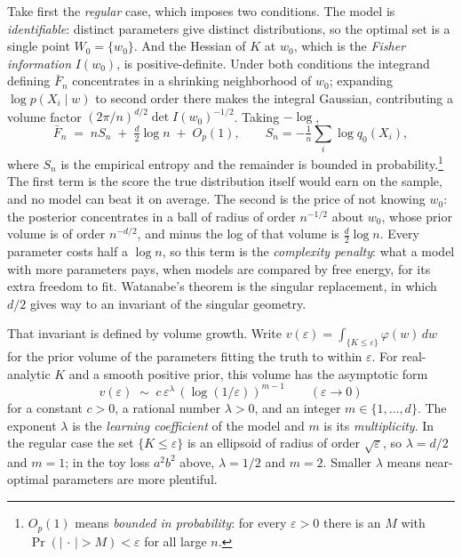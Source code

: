 Take first the \emph{regular} case, which imposes two conditions. The model is \emph{identifiable}: distinct parameters give distinct distributions, so the optimal set is a single point $W_0=\{w_0\}$. And the Hessian of $K$ at $w_0$, which is the \emph{Fisher information} $I(w_0)$, is positive-definite. Under both conditions the integrand defining $\bar F_n$ concentrates in a shrinking neighborhood of $w_0$; expanding $\log p(X_i\mid w)$ to second order there makes the integral Gaussian, contributing a volume factor $(2\pi/n)^{d/2}\det I(w_0)^{-1/2}$. Taking $-\log$,
\[
   \bar F_n \;=\; nS_n \;+\; \tfrac{d}{2}\log n \;+\; O_p(1),
   \qquad S_n=-\tfrac1n\textstyle\sum_i\log q_0(X_i),
\]
where $S_n$ is the empirical entropy and the remainder is bounded in probability.\footnote{$O_p(1)$ means \emph{bounded in probability}: for every $\varepsilon>0$ there is an $M$ with $\Pr(|\,\cdot\,|>M)<\varepsilon$ for all large $n$.} The first term is the score the true distribution itself would earn on the sample, and no model can beat it on average. The second is the price of not knowing $w_0$: the posterior concentrates in a ball of radius of order $n^{-1/2}$ about $w_0$, whose prior volume is of order $n^{-d/2}$, and minus the log of that volume is $\tfrac d2\log n$. Every parameter costs half a $\log n$, so this term is the \emph{complexity penalty}: what a model with more parameters pays, when models are compared by free energy, for its extra freedom to fit. Watanabe's theorem is the singular replacement, in which $d/2$ gives way to an invariant of the singular geometry.

That invariant is defined by volume growth. Write $v(\varepsilon)=\int_{\{K\le\varepsilon\}}\varphi(w)\,dw$ for the prior volume of the parameters fitting the truth to within $\varepsilon$. For real-analytic $K$ and a smooth positive prior, this volume has the asymptotic form
\[
   v(\varepsilon)\;\sim\;c\,\varepsilon^{\lambda}\,(\log(1/\varepsilon))^{m-1}\qquad(\varepsilon\to 0)
\]
for a constant $c>0$, a rational number $\lambda>0$, and an integer $m\in\{1,\dots,d\}$. The exponent $\lambda$ is the \emph{learning coefficient} of the model and $m$ is its \emph{multiplicity}. In the regular case the set $\{K\le\varepsilon\}$ is an ellipsoid of radius of order $\sqrt\varepsilon$, so $\lambda=d/2$ and $m=1$; in the toy loss $a^2b^2$ above, $\lambda=1/2$ and $m=2$. Smaller $\lambda$ means near-optimal parameters are more plentiful.

